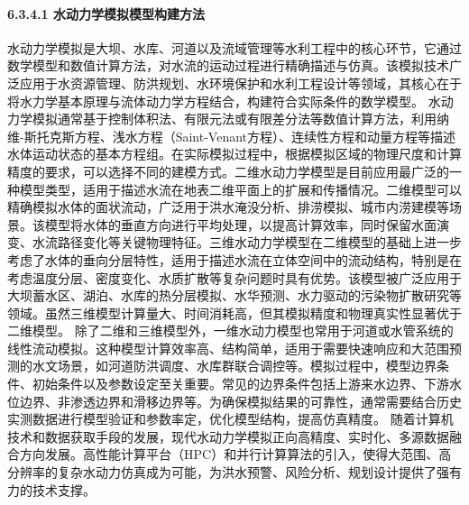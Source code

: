 \paragraph{6.3.4.1 水动力学模拟模型构建方法}\label{ux6c34ux52a8ux529bux5b66ux6a21ux62dfux6a21ux578bux6784ux5efaux65b9ux6cd5}
水动力学模拟是大坝、水库、河道以及流域管理等水利工程中的核心环节，它通过数学模型和数值计算方法，对水流的运动过程进行精确描述与仿真。该模拟技术广泛应用于水资源管理、防洪规划、水环境保护和水利工程设计等领域，其核心在于将水力学基本原理与流体动力学方程结合，构建符合实际条件的数学模型。
水动力学模拟通常基于控制体积法、有限元法或有限差分法等数值计算方法，利用纳维-斯托克斯方程、浅水方程（Saint-Venant方程）、连续性方程和动量方程等描述水体运动状态的基本方程组。在实际模拟过程中，根据模拟区域的物理尺度和计算精度的要求，可以选择不同的建模方式。二维水动力学模型是目前应用最广泛的一种模型类型，适用于描述水流在地表二维平面上的扩展和传播情况。二维模型可以精确模拟水体的面状流动，广泛用于洪水淹没分析、排涝模拟、城市内涝建模等场景。该模型将水体的垂直方向进行平均处理，以提高计算效率，同时保留水面演变、水流路径变化等关键物理特征。三维水动力学模型在二维模型的基础上进一步考虑了水体的垂向分层特性，适用于描述水流在立体空间中的流动结构，特别是在考虑温度分层、密度变化、水质扩散等复杂问题时具有优势。该模型被广泛应用于大坝蓄水区、湖泊、水库的热分层模拟、水华预测、水力驱动的污染物扩散研究等领域。虽然三维模型计算量大、时间消耗高，但其模拟精度和物理真实性显著优于二维模型。
除了二维和三维模型外，一维水动力模型也常用于河道或水管系统的线性流动模拟。这种模型计算效率高、结构简单，适用于需要快速响应和大范围预测的水文场景，如河道防洪调度、水库群联合调控等。模拟过程中，模型边界条件、初始条件以及参数设定至关重要。常见的边界条件包括上游来水边界、下游水位边界、非渗透边界和滑移边界等。为确保模拟结果的可靠性，通常需要结合历史实测数据进行模型验证和参数率定，优化模型结构，提高仿真精度。
随着计算机技术和数据获取手段的发展，现代水动力学模拟正向高精度、实时化、多源数据融合方向发展。高性能计算平台（HPC）和并行计算算法的引入，使得大范围、高分辨率的复杂水动力仿真成为可能，为洪水预警、风险分析、规划设计提供了强有力的技术支撑。
